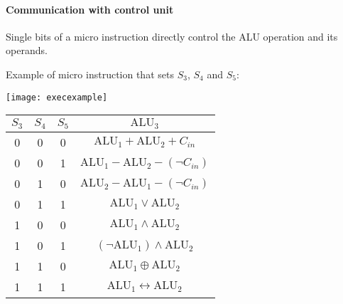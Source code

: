 \paragraph{Communication with control unit}
Single bits of a micro instruction directly control the ALU operation and its operands.
\begin{example}
	Example of micro instruction that sets $S_3$, $S_4$ and $S_5$:
	\begin{center}
		\begin{table}[!h]
			\centering
			\texttt{[image: execexample]}
			\begin{tabular}{|c|c|c|c|}
				\hline
				$S_3$ & $S_4$ & $S_5$ & $\text{ALU}_3$ \\
				\hline
				0 & 0 & 0 & $\text{ALU}_1 + \text{ALU}_2 + C_{in}$ \\
				\hline
				0 & 0 &1 & $\text{ALU}_1 - \text{ALU}_2 - (\neg C_{in})$ \\
				\hline
				0 & 1 & 0 & $\text{ALU}_2 - \text{ALU}_1 - (\neg C_{in})$ \\
				\hline
				0 & 1 & 1 & $\text{ALU}_1 \lor \text{ALU}_2$ \\
				\hline
				1 & 0 &0 & $\text{ALU}_1 \land \text{ALU}_2$ \\
				\hline
				1 & 0 & 1 & $(\neg \text{ALU}_1) \land \text{ALU}_2$ \\
				\hline
				1 & 1 & 0 & $\text{ALU}_1 \oplus \text{ALU}_2$ \\
				\hline
				1 & 1 &1 & $\text{ALU}_1 \leftrightarrow \text{ALU}_2$ \\
				\hline
			\end{tabular}
		\end{table}
	\end{center}
\end{example}

